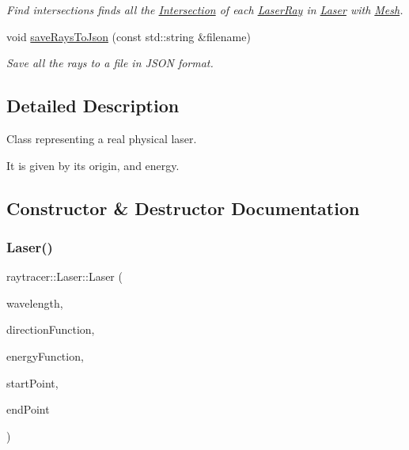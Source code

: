 \begin{DoxyCompactItemize}
\begin{DoxyCompactList}\small\item\em Find intersections finds all the \hyperlink{structraytracer_1_1Intersection}{Intersection} of each \hyperlink{classraytracer_1_1LaserRay}{Laser\+Ray} in \hyperlink{classraytracer_1_1Laser}{Laser} with \hyperlink{classraytracer_1_1Mesh}{Mesh}. \end{DoxyCompactList}\item 
void \hyperlink{classraytracer_1_1Laser_aeb6e2f23b0ce9b8e74eea3dc0f543345}{save\+Rays\+To\+Json} (const std\+::string \&filename)
\begin{DoxyCompactList}\small\item\em Save all the rays to a file in J\+S\+ON format. \end{DoxyCompactList}\end{DoxyCompactItemize}


\subsection{Detailed Description}
Class representing a real physical laser. 

It is given by its origin, and energy. 

\subsection{Constructor \& Destructor Documentation}
\mbox{\label{classraytracer_1_1Laser_a141316bde09381a6f621b2df196690a0}} 
\subsubsection{\texorpdfstring{Laser()}{Laser()}}
{\footnotesize\ttfamily raytracer\+::\+Laser\+::\+Laser (\begin{DoxyParamCaption}\item[{\hyperlink{structraytracer_1_1Length}{Length}}]{wavelength,  }\item[{Direction\+Fun}]{direction\+Function,  }\item[{Energy\+Fun}]{energy\+Function,  }\item[{\hyperlink{classraytracer_1_1Point}{Point}}]{start\+Point,  }\item[{\hyperlink{classraytracer_1_1Point}{Point}}]{end\+Point }\end{DoxyParamCaption})}



